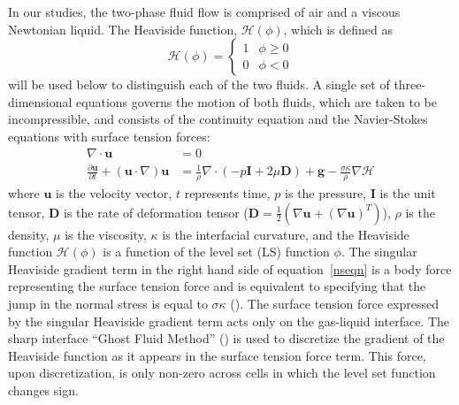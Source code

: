 \documentclass{elsarticle}
\newcommand{\Hea}{\mathcal{H}}
\newcommand{\vv}{\mathbf}
\newcommand{\bmD}{\vv{D}}
\newcommand{\bmg}{\vv{g}}
\newcommand{\bmI}{\vv{I}}
\newcommand{\bmu}{\vv{u}}
\begin{document}
In our studies,
the two-phase fluid flow is comprised of air and a 
viscous Newtonian liquid.  
The Heaviside function, $\Hea(\phi)$, which is defined as
%
\begin{equation}\label{heavyeqn}
  \Hea(\phi) = \begin{cases}
               1 & \phi \geq 0 \\
               0 & \phi <0 
               \end{cases}
\end{equation}
%
will be used below to distinguish each of the two fluids.  A single set of
three-dimensional equations governs the motion of both fluids, which are taken
to be incompressible, and consists of the continuity equation and the
Navier-Stokes equations with surface tension forces:
%
\begin{align}
  \nabla\cdot\bmu &=0  \label{divu} \\
  \frac{\partial\bmu}{\partial t}+(\bmu\cdot\nabla)\bmu &=
  \frac{1}{\rho}\nabla\cdot(-p\bmI+2\mu\bmD)+\bmg-
  \frac{\sigma\kappa}{\rho}\nabla \Hea  
  \label{nseqn}
\end{align}
%
%
where $\bmu$ is the velocity vector, $t$ represents time, $p$ is the pressure,
$\bmI$ is the unit tensor, $\bmD$ is the rate of deformation tensor
($\bmD=\frac{1}{2}(\nabla\bmu+(\nabla\bmu)^{T})$), $\rho$ is the density, $\mu$
is the viscosity, $\kappa$ is the interfacial curvature, and the Heaviside
function $\Hea(\phi)$ is a function of the level set (LS) function $\phi$. The
singular Heaviside gradient term in the right hand side of
equation~\eqref{nseqn} is a body force representing the surface tension force
and is equivalent to specifying that the jump in the normal stress is equal to
$\sigma\kappa$ (\citet{TanguyEtAl2007}).  The surface tension force expressed by
the singular Heaviside gradient term acts only on the gas-liquid interface.
The sharp interface ``Ghost Fluid Method'' (\citet{KanFedLiu00}) is used to
discretize the gradient of the Heaviside function as it appears in the surface
tension force term.  This force, upon discretization, is only non-zero across
cells in which the level set function changes sign.
\end{document}
